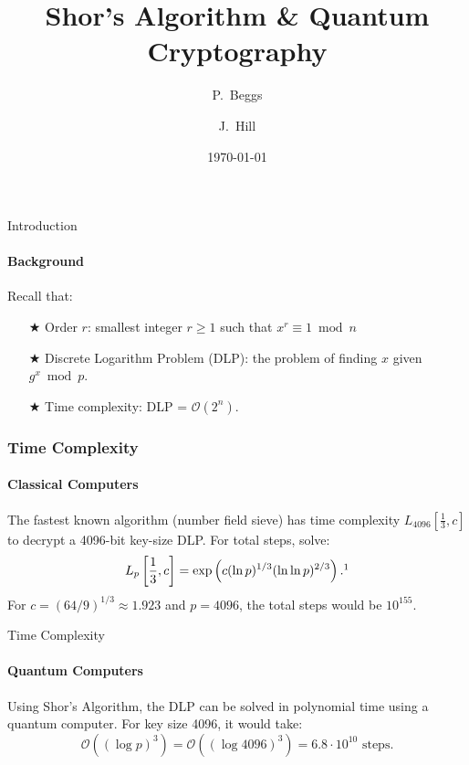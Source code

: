 \documentclass{beamer}
\title{Shor's Algorithm \& Quantum Cryptography}
\author[Beggs, Hill] %
{P.~Beggs \and J.~Hill}
\institute%
{
  Department of Mathematics and Computer Science\\
  Hendrix College}
\date{\today}
\begin{document}
\begin{frame}
    \titlepage
\end{frame}



\begin{frame}{Introduction}
	\framesubtitle{Background}
		Recall that: 
		\begin{itemize}
		\item[$\bigstar$] Order \(r\): smallest integer \(r \geq 1\) such that \(x^r \equiv 1 \bmod n\)
		\pause
        \item[$\bigstar$] Discrete Logarithm Problem (DLP): the problem of finding \(x\) given \(g^x\bmod p\).
		\pause
		\item[$\bigstar$] Time complexity: DLP = \(\mathcal{O}(2^{n})\).
	\end{itemize}
\end{frame}




\begin{frame}
	\frametitle{Time Complexity}
	\framesubtitle{Classical Computers}
	The fastest known algorithm (number field sieve) has time complexity \(L_{4096}[\frac{1}{3},c]\) to decrypt a 4096-bit key-size DLP.
	For total steps, solve:
	\[
		L_{p}\left[\frac{1}{3},c\right] = \exp\left(c(\ln p)^{1/3}(\ln\ln p)^{2/3}\right).\footnote{Menezes, A. J., Van Oorschot, P. C., \& Vanstone, S. A. (2018). \textit{Handbook of applied cryptography.} CRC press.
		}
	\]
	\pause
	For \(c = (64/9)^{1/3} \approx 1.923\) and \(p = 4096\), the total steps would be \(10^{155}\). 
\end{frame}




\begin{frame}{Time Complexity}
	\framesubtitle{Quantum Computers}
	Using Shor's Algorithm, the DLP can be solved in polynomial time using a quantum computer. For key size 4096, it would take:
	\pause
	\[
		\mathcal{O}\left((\log p)^{3}\right) = \mathcal{O}\left((\log 4096)^{3}\right) = 6.8 \cdot 10^{10} \text{ steps.}
	\]
\end{frame}
\end{document}
